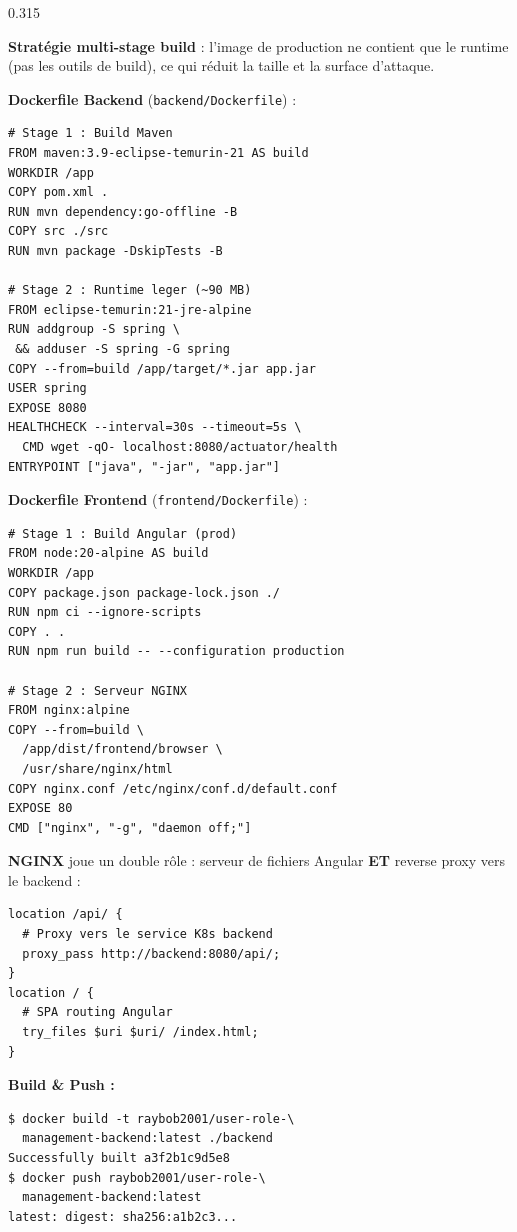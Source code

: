 \documentclass[final]{beamer}
\begin{document}
\begin{frame}[t]{}
\begin{columns}[t]
\begin{column}{0.315\linewidth}
\begin{tcolorbox}[sectionbox, title={\faDocker\quad Conteneurisation Docker}]
\textbf{Stratégie multi-stage build} : l'image de production ne contient que le runtime (pas les outils de build), ce qui réduit la taille et la surface d'attaque.

\vspace{8pt}
\textbf{Dockerfile Backend} (\texttt{backend/Dockerfile}) :
\begin{tcolorbox}[codebox]
\begin{lstlisting}
# Stage 1 : Build Maven
FROM maven:3.9-eclipse-temurin-21 AS build
WORKDIR /app
COPY pom.xml .
RUN mvn dependency:go-offline -B
COPY src ./src
RUN mvn package -DskipTests -B

# Stage 2 : Runtime leger (~90 MB)
FROM eclipse-temurin:21-jre-alpine
RUN addgroup -S spring \
 && adduser -S spring -G spring
COPY --from=build /app/target/*.jar app.jar
USER spring
EXPOSE 8080
HEALTHCHECK --interval=30s --timeout=5s \
  CMD wget -qO- localhost:8080/actuator/health
ENTRYPOINT ["java", "-jar", "app.jar"]
\end{lstlisting}
\end{tcolorbox}

\vspace{6pt}
\textbf{Dockerfile Frontend} (\texttt{frontend/Dockerfile}) :
\begin{tcolorbox}[codebox]
\begin{lstlisting}
# Stage 1 : Build Angular (prod)
FROM node:20-alpine AS build
WORKDIR /app
COPY package.json package-lock.json ./
RUN npm ci --ignore-scripts
COPY . .
RUN npm run build -- --configuration production

# Stage 2 : Serveur NGINX
FROM nginx:alpine
COPY --from=build \
  /app/dist/frontend/browser \
  /usr/share/nginx/html
COPY nginx.conf /etc/nginx/conf.d/default.conf
EXPOSE 80
CMD ["nginx", "-g", "daemon off;"]
\end{lstlisting}
\end{tcolorbox}

\vspace{6pt}
\textbf{NGINX} joue un double rôle : serveur de fichiers Angular \textbf{ET} reverse proxy vers le backend :
\begin{tcolorbox}[codebox]
\begin{lstlisting}
location /api/ {
  # Proxy vers le service K8s backend
  proxy_pass http://backend:8080/api/;
}
location / {
  # SPA routing Angular
  try_files $uri $uri/ /index.html;
}
\end{lstlisting}
\end{tcolorbox}

\vspace{6pt}
\textbf{Build \& Push :}
\begin{tcolorbox}[codebox]
\begin{lstlisting}
$ docker build -t raybob2001/user-role-\
  management-backend:latest ./backend
Successfully built a3f2b1c9d5e8
$ docker push raybob2001/user-role-\
  management-backend:latest
latest: digest: sha256:a1b2c3...
\end{lstlisting}
\end{tcolorbox}


\end{tcolorbox}
\end{column}
\end{columns}
\end{frame}
\end{document}
